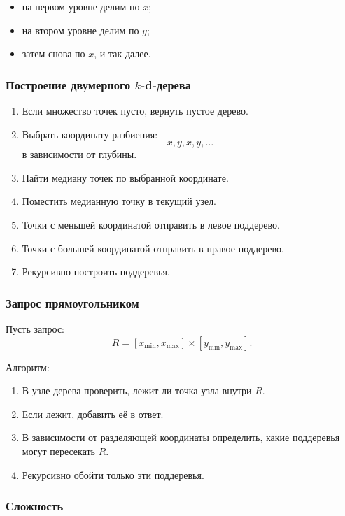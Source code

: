 \documentclass[12pt,a4paper]{article}
\begin{document}
\begin{itemize}
    \item на первом уровне делим по \(x\);
    \item на втором уровне делим по \(y\);
    \item затем снова по \(x\), и так далее.
\end{itemize}

\subsubsection{Построение двумерного \(k\)-d-дерева}

\begin{enumerate}
    \item Если множество точек пусто, вернуть пустое дерево.
    \item Выбрать координату разбиения:
    \[
    x, y, x, y,\dots
    \]
    в зависимости от глубины.
    \item Найти медиану точек по выбранной координате.
    \item Поместить медианную точку в текущий узел.
    \item Точки с меньшей координатой отправить в левое поддерево.
    \item Точки с большей координатой отправить в правое поддерево.
    \item Рекурсивно построить поддеревья.
\end{enumerate}

\subsubsection{Запрос прямоугольником}

Пусть запрос:
\[
R=[x_{\min},x_{\max}]\times[y_{\min},y_{\max}].
\]

Алгоритм:

\begin{enumerate}
    \item В узле дерева проверить, лежит ли точка узла внутри \(R\).
    \item Если лежит, добавить её в ответ.
    \item В зависимости от разделяющей координаты определить, какие поддеревья могут пересекать \(R\).
    \item Рекурсивно обойти только эти поддеревья.
\end{enumerate}

\subsubsection{Сложность}
\end{document}

